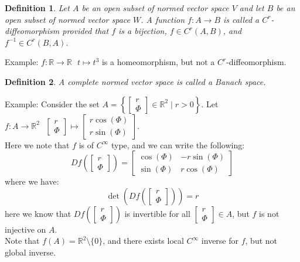 \documentclass[11pt,oneside]{book}
\theoremstyle{break}
\theoremstyle{break}
\newtheorem{defn}{Definition}[corL]
\newcommand{\R}{\mathbb{R}}
\newcommand{\example}{\color{green}Example: \color{black}}
\begin{document}
\begin{defn}
Let $A$ be an open subset of normed vector space $V$ and let $B$ be an open subset of normed vector space $W$. A function $f:A \to B$ is called a $C^r$-diffeomorphism provided that $f$ is a bijection, $f\in C^r(A,B)$, and $f^{-1} \in C^r(B,A)$.
\end{defn}

\example $f:\R \to \R \ \ \ t\mapsto t^3$ is a homeomorphism, but not a $C^r$-diffeomorphism. 

\begin{defn}
A complete normed vector space is called a Banach space.
\end{defn}


\example Consider the set $A = \left\{\begin{bmatrix} r\\\Phi \end{bmatrix} \in \R^2 \mid r>0\right\}$. Let $f:A \to \R^2 \ \ \ \begin{bmatrix} r\\\Phi \end{bmatrix}\mapsto \begin{bmatrix} r\cos(\Phi)\\r\sin(\Phi )\end{bmatrix}$.\\ Here we note that $f$ is of $C^\infty$ type, and we can write the following: $$Df\left(\begin{bmatrix} r\\\Phi \end{bmatrix}\right) = \begin{bmatrix} \cos\left(\Phi\right)& -r\sin\left(\Phi\right)\\\sin\left(\Phi\right)&r\cos\left(\Phi\right) \end{bmatrix}$$
where we have: $$\det\left(Df\left(\begin{bmatrix} r\\\Phi \end{bmatrix}\right)\right) = r$$ here we know that $Df\left(\begin{bmatrix} r\\\Phi \end{bmatrix}\right)$ is invertible for all $\begin{bmatrix} r\\\Phi \end{bmatrix} \in A$, but $f$ is not injective on $A$. \\Note that $f\left(A\right) = \R^2 \setminus \{0\}$, and there exists local $C^\infty$ inverse for $f$, but not global inverse.
\end{document}
